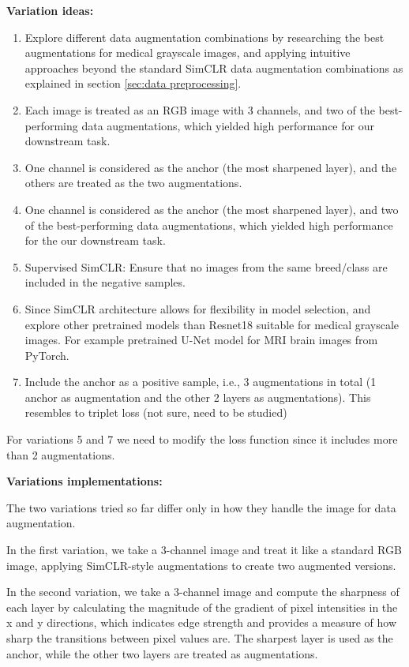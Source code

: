 \textbf{Variation ideas:}

\begin{enumerate}
  \item Explore different data augmentation combinations by researching the best augmentations for medical grayscale images, and applying intuitive approaches beyond the standard SimCLR \cite{chen2020simple} data augmentation combinations as explained in section \ref{sec:data preprocessing}.
  \item Each image is treated as an RGB image with 3 channels, and two of the best-performing data augmentations, which yielded high performance for our downstream task.

  \item One channel is considered as the anchor (the most sharpened layer), and the others are treated as the two augmentations.
  \item One channel is considered as the anchor (the most sharpened layer), and two of the best-performing data augmentations, which yielded high performance for the our downstream task.
  \item Supervised SimCLR: Ensure that no images from the same breed/class are included in the negative samples.
  \item Since SimCLR architecture \cite{chen2020simple} allows for flexibility in model selection, and explore other pretrained models  than Resnet18  suitable for medical grayscale images. For example pretrained U-Net \cite{ronneberger2015unetconvolutionalnetworksbiomedical} model for MRI brain images from PyTorch.  
  \item Include the anchor as a positive sample, i.e., 3 augmentations in total (1 anchor as augmentation and the other 2 layers as augmentations). This resembles to triplet loss (not sure, need to be studied)  
\end{enumerate}
For variations 5 and 7 we need to modify the loss function since it includes more than 2 augmentations.

\textbf{Variations implementations:}  \label{sec:variations_implementations}

The two variations tried so far differ only in how they handle the image for data augmentation. 

In the first variation, we take a 3-channel image and treat it like a standard RGB image, applying SimCLR-style augmentations to create two augmented versions.

In the second variation, we take a 3-channel image and compute the sharpness of each layer by calculating the magnitude of the gradient of pixel intensities in the x and y directions, which indicates edge strength and provides a measure of how sharp the transitions between pixel values are. The sharpest layer is used as the anchor, while the other two layers are treated as augmentations. 

